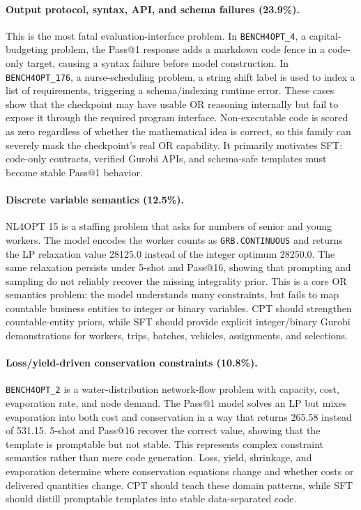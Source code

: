 \paragraph{Output protocol, syntax, API, and schema failures (23.9\%).}
This is the most fatal evaluation-interface problem. In \texttt{BENCH4OPT\_4},
a capital-budgeting problem, the Pass@1 response adds a markdown code fence in
a code-only target, causing a syntax failure before model construction. In
\texttt{BENCH4OPT\_176}, a nurse-scheduling problem, a string shift label is
used to index a list of requirements, triggering a schema/indexing runtime
error. These cases show that the checkpoint may have usable OR reasoning
internally but fail to expose it through the required program interface.
Non-executable code is scored as zero regardless of whether the mathematical
idea is correct, so this family can severely mask the checkpoint's real OR
capability. It primarily motivates SFT: code-only contracts, verified Gurobi
APIs, and schema-safe templates must become stable Pass@1 behavior.

\paragraph{Discrete variable semantics (12.5\%).}
NL4OPT 15 is a staffing problem that asks for numbers of senior and young
workers. The model encodes the worker counts as \texttt{GRB.CONTINUOUS} and
returns the LP relaxation value 28125.0 instead of the integer optimum
28250.0. The same relaxation persists under 5-shot and Pass@16, showing that
prompting and sampling do not reliably recover the missing integrality prior.
This is a core OR semantics problem: the model understands many constraints,
but fails to map countable business entities to integer or binary variables.
CPT should strengthen countable-entity priors, while SFT should provide
explicit integer/binary Gurobi demonstrations for workers, trips, batches,
vehicles, assignments, and selections.

\paragraph{Loss/yield-driven conservation constraints (10.8\%).}
\texttt{BENCH4OPT\_2} is a water-distribution network-flow problem with
capacity, cost, evaporation rate, and node demand. The Pass@1 model solves an
LP but mixes evaporation into both cost and conservation in a way that returns
265.58 instead of 531.15. 5-shot and Pass@16 recover the correct value,
showing that the template is promptable but not stable. This represents
complex constraint semantics rather than mere code generation. Loss, yield,
shrinkage, and evaporation determine where conservation equations change and
whether costs or delivered quantities change. CPT should teach these domain
patterns, while SFT should distill promptable templates into stable
data-separated code.


